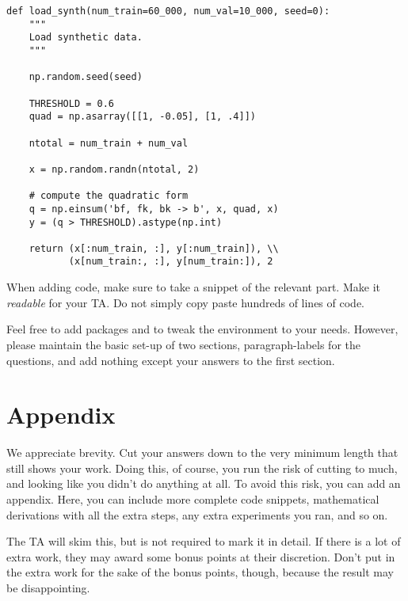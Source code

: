 \documentclass{article}
\begin{document}
\begin{verbatim}
def load_synth(num_train=60_000, num_val=10_000, seed=0):
    """
    Load synthetic data.
    """
    
    np.random.seed(seed)

    THRESHOLD = 0.6
    quad = np.asarray([[1, -0.05], [1, .4]])

    ntotal = num_train + num_val

    x = np.random.randn(ntotal, 2)

    # compute the quadratic form
    q = np.einsum('bf, fk, bk -> b', x, quad, x)
    y = (q > THRESHOLD).astype(np.int)

    return (x[:num_train, :], y[:num_train]), \\
           (x[num_train:, :], y[num_train:]), 2
\end{verbatim}

\noindent When adding code, make sure to take a snippet of the relevant part. Make it \emph{readable} for your TA. Do not simply copy paste hundreds of lines of code.

Feel free to add packages and to tweak the environment to your needs. However, please maintain the basic set-up of two sections, paragraph-labels for the questions, and add nothing except your answers to the first section.

\appendix
\section{Appendix}

We appreciate brevity. Cut your answers down to the very minimum length that still shows your work. Doing this, of course, you run the risk of cutting to much, and looking like you didn't do anything at all. To avoid this risk, you can add an appendix. Here, you can include more complete code snippets, mathematical derivations with all the extra steps, any extra experiments you ran, and so on. 

The TA will skim this, but is not required to mark it in detail. If there is a lot of extra work, they may award some bonus points at their discretion. Don't put in the extra work for the sake of the bonus points, though, because the result may be disappointing.
\end{document}
